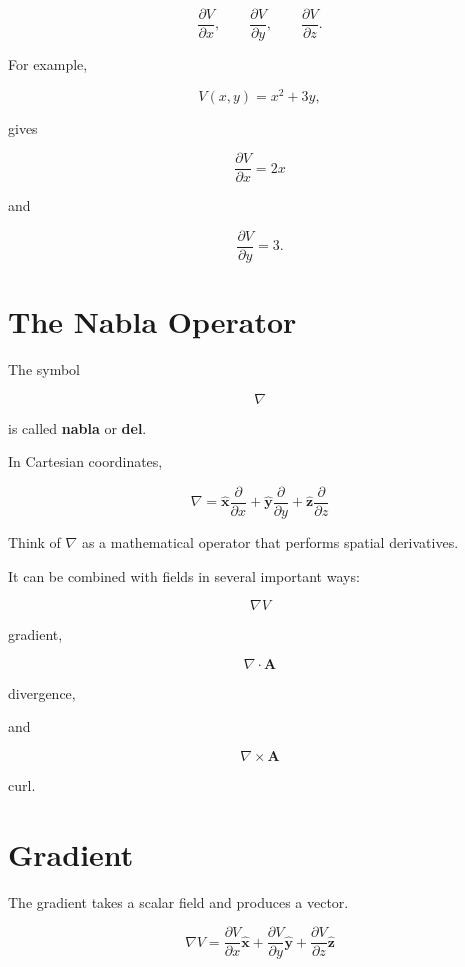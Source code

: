 \documentclass[11pt]{article}
\newcommand{\vect}[1]{\mathbf{#1}}
\newcommand{\uvect}[1]{\hat{\mathbf{#1}}}
\begin{document}
\[
\frac{\partial V}{\partial x},
\qquad
\frac{\partial V}{\partial y},
\qquad
\frac{\partial V}{\partial z}.
\]

For example,

\[
V(x,y)=x^2+3y,
\]

gives

\[
\frac{\partial V}{\partial x}=2x
\]

and

\[
\frac{\partial V}{\partial y}=3.
\]



\section{The Nabla Operator}

The symbol

\[
\nabla
\]

is called \textbf{nabla} or \textbf{del}.

In Cartesian coordinates,

\[
\boxed{
\nabla
=
\uvect{x}\frac{\partial}{\partial x}
+
\uvect{y}\frac{\partial}{\partial y}
+
\uvect{z}\frac{\partial}{\partial z}
}
\]

Think of $\nabla$ as a mathematical operator that performs spatial derivatives.

It can be combined with fields in several important ways:

\[
\nabla V
\]

gradient,

\[
\nabla\cdot\vect{A}
\]

divergence,

and

\[
\nabla\times\vect{A}
\]

curl.



\section{Gradient}

The gradient takes a scalar field and produces a vector.

\[
\boxed{
\nabla V
=
\frac{\partial V}{\partial x}\uvect{x}
+
\frac{\partial V}{\partial y}\uvect{y}
+
\frac{\partial V}{\partial z}\uvect{z}
}
\]
\end{document}
